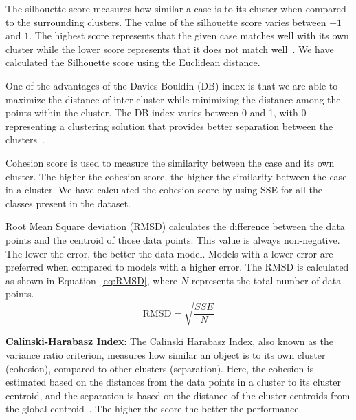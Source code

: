 \documentclass{article}
\begin{document}
\begin{description}
\item[Silhouette Score:] The silhouette score measures how similar a case is to its cluster when compared to the surrounding clusters. The value of the silhouette score varies between $-1$ and $1$. The highest score represents that the given case matches well with its own cluster while the lower score represents that it does not match well~\cite{shahapureClusterQualityAnalysis2020}. We have calculated the Silhouette score using the Euclidean distance.
   
\item[Davies Bouldin Index:] One of the advantages of the Davies Bouldin (DB) index is that we are able to maximize the distance of inter-cluster while minimizing the distance among the points within the cluster. The DB index varies between 0 and 1, with 0 representing a clustering solution that provides better separation between the clusters~\cite{mittalClusteringEvaluationDaviesBouldin2020}.
    
\item[Cohesion Score:] Cohesion score is used to measure the similarity between the case and its own cluster. The higher the cohesion score, the higher the similarity between the case in a cluster. We have calculated the cohesion score by using SSE for all the classes present in the dataset.
    
\item[Root Mean Square deviation:] Root Mean Square deviation (RMSD) calculates the difference between the data points and the centroid of those data points. This value is always non-negative. The lower the error, the better the data model. Models with a lower error are preferred when compared to models with a higher error. The RMSD is calculated as shown in Equation~\autoref{eq:RMSD}, where $N$ represents the total number of data points.
     \begin{equation}
     \mathrm{RMSD} = \sqrt{\frac{SSE}{N}}
     \label{eq:RMSD}
     \end{equation}
     
    \item \textbf{Calinski-Harabasz Index}:
    The Calinski Harabasz Index, also known as the variance ratio criterion, measures how similar an object is to its own cluster (cohesion), compared to other clusters (separation). Here, the cohesion is estimated based on the distances from the data points in a cluster to its cluster centroid, and the separation is based on the distance of the cluster centroids from the global centroid~\cite{calinskiDendriteMethodCluster1974}. The higher the score the better the performance.
    

\end{description}
\end{document}
